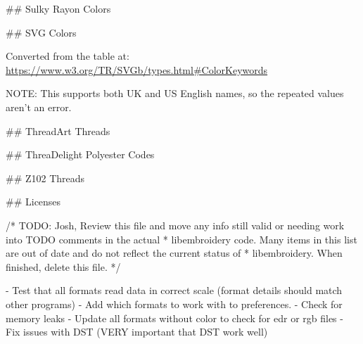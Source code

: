 %

## Sulky Rayon Colors


%

## SVG Colors

Converted from the table at:
\url{https://www.w3.org/TR/SVGb/types.html#ColorKeywords}

NOTE: This supports both UK and US English names, so the repeated values aren't
an error.

## ThreadArt Threads


% 

% 

## ThreaDelight Polyester Codes


## Z102 Threads



## Licenses


/* TODO: Josh, Review this file and move any info still valid or needing work into TODO comments in the actual
 *       libembroidery code. Many items in this list are out of date and do not reflect the current status of
 *       libembroidery. When finished, delete this file.
 */

- Test that all formats read data in correct scale (format details should match other programs)
- Add which formats to work with to preferences.
- Check for memory leaks
- Update all formats without color to check for edr or rgb files
- Fix issues with DST (VERY important that DST work well)

